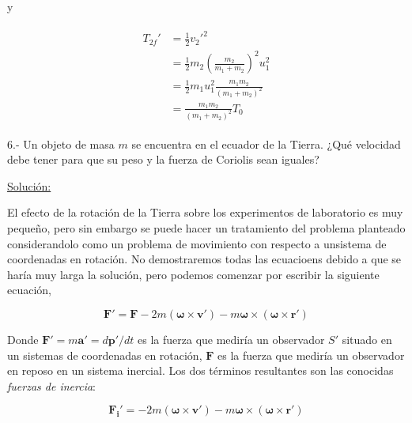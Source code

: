 \documentclass[a4paper,10pt]{article}
\begin{document}
y

\begin{align}
\begin{split} 
%
 T_{2f}' &= \frac{1}{2} v_2'^2 \\
%
	 &= \frac{1}{2}m_2\left(\frac{m_2}{m_1+m_2}\right)^2 u_1^2 \\
%
	 &= \frac{1}{2}m_1 u_1^2 \frac{m_1 m_2}{(m_1+m_2)^2} \\
%
	 &= \frac{m_1 m_2}{(m_1+m_2)^2} T_0
%
\label{eq:erergCineFinalm2CM}
\end{split}
\end{align}







6.- Un objeto de masa $m$ se encuentra en el ecuador de la Tierra. ¿Qué velocidad debe 
tener para que su peso y la fuerza de Coriolis sean iguales?

\vspace{.3cm}

\underline{Solución:}

\vspace{.3cm}

El efecto de la rotación de la Tierra sobre los experimentos de laboratorio es muy pequeño, pero sin embargo se puede
hacer un tratamiento del problema planteado considerandolo como un problema de movimiento con respecto
a unsistema de coordenadas en rotación. No demostraremos todas las ecuacioens debido a que se haría
muy larga la solución, pero podemos comenzar por escribir la siguiente ecuación,

\begin{equation}
 \mathbf{F'} = \mathbf{F} - 2m(\mathbf{\omega} \times \mathbf{v'}) - m\mathbf{\omega} \times (\mathbf{\omega} \times \mathbf{r'})
 \label{eq:FuerzasDeSistemaRotacion}
\end{equation}

Donde $\mathbf{F'} = m\mathbf{a'} = d\mathbf{p'}/dt$ es la fuerza que mediría un observador $S'$ situado
en un sistemas de coordenadas en rotación, $\mathbf{F}$ es la fuerza que mediría un observador
en reposo en un sistema inercial. Los dos términos resultantes son las conocidas \emph{fuerzas de inercia}:

\begin{equation}
 \mathbf{F_i'} = - 2m(\mathbf{\omega} \times \mathbf{v'}) - m\mathbf{\omega} \times (\mathbf{\omega} \times \mathbf{r'})
 \label{eq:FuerzasDeInercia}
\end{equation}
\end{document}
